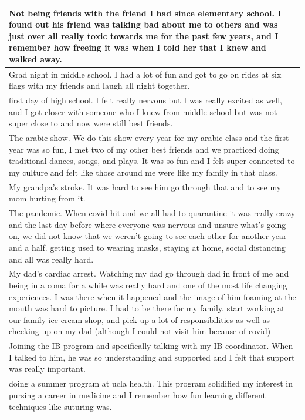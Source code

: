 \documentclass[
  .7em,
  letterpaper,
  DIV=11,
  numbers=noendperiod]{scrartcl}
\begin{document}
\begin{table}
\begin{tabular}{l}
\hline
Not being friends with the friend I had since elementary school. I found out his friend was talking bad about me to others and was just over all really toxic towards me for the past few years, and I remember how freeing it was when I told her that I knew and walked away.\\
\hline
Grad night in middle school. I had a lot of fun and got to go on rides at six flags with my friends and laugh all night together.\\
\hline
first day of high school. I felt really nervous but I was really excited as well, and I got closer with someone who I knew from middle school but was not super close to and now were still best friends.\\
\hline
The arabic show. We do this show every year for my arabic class and the first year was so fun, I met two of my other best friends and we practiced doing traditional dances, songs, and plays. It was so fun and I felt super connected to my culture and felt like those around me were like my family in that class.\\
\hline
My grandpa's stroke. It was hard to see him go through that and to see my mom hurting from it.\\
\hline
The pandemic. When covid hit and we all had to quarantine it was really crazy and the last day before where everyone was nervous and unsure what's going on, we did not know that we weren't going to see each other for another year and a half. getting used to wearing masks, staying at home, social distancing and all was really hard.\\
\hline
My dad's cardiac arrest. Watching my dad go through dad in front of me and being in a coma for a while was really hard and one of the most life changing experiences. I was there when it happened and the image of him foaming at the mouth was hard to picture. I had to be there for my family, start working at our family ice cream shop, and pick up a lot of responsibilities as well as checking up on my dad (although I could not visit him because of covid)\\
\hline
Joining the IB program and specifically talking with my IB coordinator. When I talked to him, he was so understanding and supported and I felt that support was really important.\\
\hline
doing a summer program at ucla health. This program solidified my interest in pursing a career in medicine and I remember how fun learning different techniques like suturing was.\\
\hline

\end{tabular}
\end{table}
\end{document}
